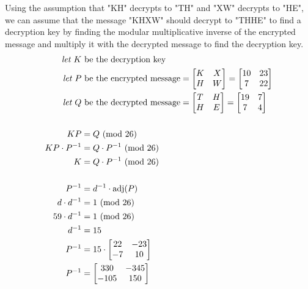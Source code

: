 \documentclass{../mathhomework}
\newcommand{\Mod}[1]{\ (\mathrm{mod}\ #1)}
\newcommand{\Adj}[1]{\mathrm{adj}(#1)}
\newcommand{\BlankLine}{\nonumber \\}
\begin{document}
\begin{problem}
    \begin{solution}
        Using the assumption that "KH" decrypts to "TH" and "XW" decrypts to "HE", we can assume that the message "KHXW" should decrypt to "THHE" to find a decryption key by finding the modular
        multiplicative inverse of the encrypted message and multiply it with the decrypted message to find the decryption key.
        \begin{align}
            \Let K &\text{ be the decryption key} \\
            \Let P &\text{ be the encrypted message} = \begin{bmatrix}
                K & X \\ H & W
            \end{bmatrix} = \begin{bmatrix}
                10 & 23 \\ 7 & 22
            \end{bmatrix}\\
            \Let Q &\text{ be the decrypted message} = \begin{bmatrix}
                T & H \\ H & E
            \end{bmatrix} = \begin{bmatrix}
                19 & 7 \\ 7 & 4
            \end{bmatrix}\\
            \BlankLine
            KP & = Q \Mod{26} \\
            KP \cdot P^{-1} &= Q \cdot P^{-1} \Mod{26} \\
            K & = Q \cdot P^{-1} \Mod{26} \\
            \BlankLine
            P^{-1} & = d^{-1} \cdot \Adj{P} \\
            d \cdot d^{-1} & = 1 \Mod{26} \\
            59 \cdot d^{-1} & = 1 \Mod{26} \\
            d^{-1} &= 15 \\
            P^{-1} &= 15 \cdot \begin{bmatrix}
                22 & -23 \\ -7 & 10
            \end{bmatrix} \\
            P^{-1} & = \begin{bmatrix}
                330 & -345 \\ -105 & 150
            \end{bmatrix} \\

\end{align}
\end{solution}
\end{problem}
\end{document}
